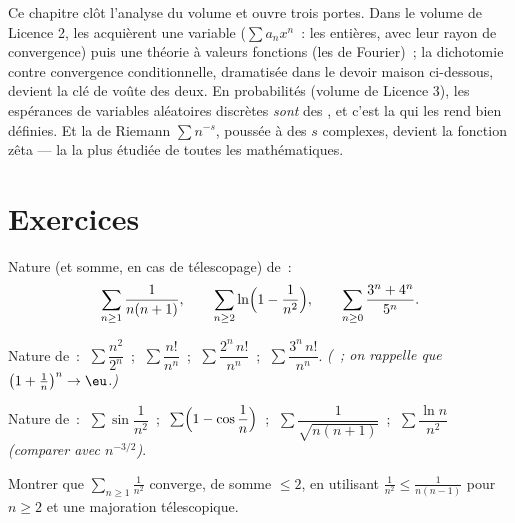 \begin{remark}
Ce chapitre clôt l'analyse du volume et ouvre trois portes. Dans le
volume de Licence 2, les  acquièrent une variable ($\sum
a_n x^n$~: les  entières, avec leur rayon de convergence) puis
une théorie à valeurs fonctions (les  de Fourier)~; la
dichotomie  contre convergence conditionnelle,
dramatisée dans le devoir maison ci-dessous, devient la clé de voûte
des deux. En probabilités (volume de Licence 3), les espérances de
variables aléatoires discrètes \emph{sont} des , et c'est la
 qui les rend bien définies. Et la  de
Riemann $\sum n^{-s}$, poussée à des $s$ complexes, devient la
fonction zêta --- la  la plus étudiée de toutes les
mathématiques.
\end{remark}

\section{Exercices}

\begin{exercise}[$\star$]\label{exo:b1:series:1}
Nature (et somme, en cas de télescopage) de~:
\[
\sum_{n\geq1} \frac{1}{n(n+1)},
\qquad
\sum_{n\geq2} \ln\Bigl(1 - \frac{1}{n^2}\Bigr),
\qquad
\sum_{n\geq0} \frac{3^n + 4^n}{5^n} .
\]
\end{exercise}

\begin{exercise}[$\star$]\label{exo:b1:series:2}
Nature de~: $\;\sum \dfrac{n^2}{2^n}$~; $\;\sum \dfrac{n!}{n^n}$~;
$\;\sum \dfrac{2^n\,n!}{n^n}$~; $\;\sum \dfrac{3^n\,n!}{n^n}$.
\emph{(~; on rappelle que $\bigl(1 + \frac1n\bigr)^n \to \eu$.)}
\end{exercise}

\begin{exercise}[$\star$]\label{exo:b1:series:3}
Nature de~: $\;\sum \sin\dfrac{1}{n^2}$~; $\;\sum
\Bigl(1 - \cos\dfrac1n\Bigr)$~; $\;\sum \dfrac{1}{\sqrt{n(n+1)}}$~;
$\;\sum \dfrac{\ln n}{n^2}$ \emph{(comparer avec $n^{-3/2}$)}.
\end{exercise}

\begin{exercise}[$\star$]\label{exo:b1:series:4}
Montrer que $\sum_{n\geq1} \frac{1}{n^2}$ converge, de somme $\leq 2$,
en utilisant $\frac{1}{n^2} \leq \frac{1}{n(n-1)}$ pour $n \geq 2$ et
une majoration télescopique.
\end{exercise}

